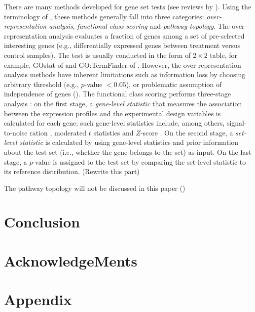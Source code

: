 \documentclass[11pt, a4paper]{article}
\begin{document}
		 There are many methods developed for gene set tests (see reviews by  \cite{huang2009bioinformatics, khatri2012ten, tarca2013comparison}). Using the terminology of \cite{khatri2012ten}, these methods generally fall into three categories: \textit{over-representation analysis}, \textit{functional class scoring} and \textit{pathway topology}. The over-representation analysis evaluates a fraction of genes among a set of pre-selected interesting genes (e.g., differentially expressed genes between treatment versus control samples). The test is usually conducted in the form of $2\times 2$ table, for example, GOstat of \cite{klebanov2007multivariate} and GO:TermFinder of \cite{tian2005discovering}. However, the over-representation analysis methods have inherent limitations such as information loss by choosing arbitrary threshold (e.g., $p$-value $< 0.05$), or problematic assumption of independence of genes (\cite{goeman2007analyzing, wu2012camera}). The functional class scoring performs three-stage analysis \citep{khatri2012ten}: on the first stage, a \textit{gene-level statistic} that measures the association between the expression profiles and the experimental design variables is calculated for each gene; such gene-level statistics include, among others, signal-to-noise ration \citep{subramanian2005gene}, moderated $t$ statistics \citep{Smyth2004moderated} and  $Z$-score \citep{efron2007correlation}. On the second stage, a \textit{set-level statistic} is calculated by using gene-level statistics and prior information about the test set (i.e., whether the gene belongs to the set) as input. On the last stage, a $p$-value is assigned to the test set by comparing the set-level statistic to its reference distribution.  (Rewrite this part)
		 
		 The pathway topology will not be discussed in this paper (\cite{khatri2012ten, tarca2013comparison})
		 	
	\section{Conclusion}\label{section:conclusion}
	
	\section{AcknowledgeMents}\label{section:acknowledgement}
	
	\section{Appendix}\label{section:appendix}
	
\end{document}
